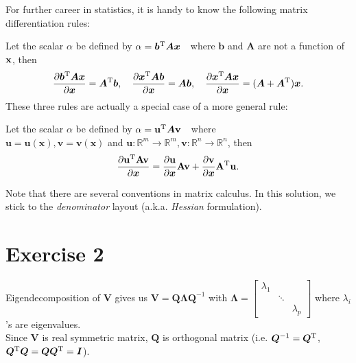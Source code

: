 \documentclass[a4paper]{article}
\begin{document}
\vspace{1cm}
For further career in statistics, it is handy to know the following matrix differentiation rules:
\begin{framed}
Let the scalar $\alpha$ be defined by $\alpha = \bm{b}^{\rm T}\bm{A}\bm{x}$~~where $\bm{b}$ and $\bm{A}$ are not a function of $\bf{x}$, then
\begin{align*}
\frac{\partial \bm{b}^{\rm T}\bm{A}\bm{x}}{\partial \bm{x}} = \bm{A}^{\rm T}\bm{b},\quad
\frac{\partial \bm{x}^{\rm T}\bm{A}\bm{b}}{\partial \bm{x}} = \bm{A}\bm{b},\quad
\frac{\partial \bm{x}^{\rm T}\bm{A}\bm{x}}{\partial \bm{x}} = (\bm{A}+\bm{A}^{\rm T})\bm{x}.\\
\end{align*}
These three rules are actually a special case of a more general rule:

Let the scalar $\alpha$ be defined by $\alpha = \mathbf{u}^{\rm T}\bm{A}\mathbf{v}$~~where\\
 $\mathbf{u} = \mathbf{u}(\bm{x}), \mathbf{v} = \mathbf{v}(\bm{x})$ and $\mathbf{u}: \mathbb{R}^m \rightarrow \mathbb{R}^m, \mathbf{v}: \mathbb{R}^n \rightarrow \mathbb{R}^n$, then
\begin{align*}
\frac{\partial \mathbf{u}^{\rm T}{\mathbf{A}}\mathbf{v}}{\partial \bm{x}} = 
\frac{\partial \mathbf{u}}{\partial \bm{x}}{\mathbf{A}}{\mathbf{v}} + \frac{\partial \mathbf{v}}{\partial \bm{x}}\mathbf{A}^{\rm T}\mathbf {u}.
\end{align*}

Note that there are several conventions in matrix calculus. In this solution, we stick to the \textit{denominator} layout (a.k.a. \textit{Hessian} formulation).
\end{framed}


\newpage
\section{Exercise 2}
Eigendecomposition of $\bm{V}$ gives us $\bm{V} = \bm{Q}\bm{\Lambda}\bm{Q}^{-1}$ with $\bm{\Lambda} = 
\begin{bmatrix}
\lambda_{1} & &\\
 & \ddots & \\
 &  & \lambda_{p}
\end{bmatrix}$ where $\lambda_{i}$'s are eigenvalues.\\
Since $\bm{V}$ is real symmetric matrix, $\bm{Q}$ is orthogonal matrix (i.e. $\bm{Q}^{-1} = \bm{Q}^{\rm T}$, $\bm{Q}^{\rm T}\bm{Q} = \bm{Q}\bm{Q}^{\rm T} = \bm{I}$).
\end{document}
